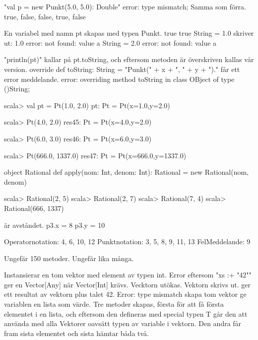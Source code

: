 "val p = new Punkt(5.0, 5.0): Double" error: type mismatch;
Samma som förra.
\Subtask 
true, false, false, true, false

\Task %
\Subtask 
En variabel med namn pt skapas med typen Punkt.
true
true
String = 1.0
skriver ut: 1.0
error: not found: value a
String = 2.0
error: not found: value a

\Task %
\Subtask 
"println(pt)" kallar på pt.toString, och eftersom metoden är överskriven kallas vår version.
\Subtask 
override def toString: String = "Punkt(" + x + ", " + y + ")."
\Subtask 
får ett error meddelande.
error: overriding method toString in class OBject of type ()String;

\Task %
\Subtask 
\begin{REPL}
scala> val pt = Pt(1.0, 2.0)
pt: Pt = Pt(x=1.0,y=2.0)

scala> Pt(4.0, 2.0)
res45: Pt = Pt(x=4.0,y=2.0)

scala> Pt(6.0, 3.0)
res46: Pt = Pt(x=6.0,y=3.0)

scala> Pt(666.0, 1337.0)
res47: Pt = Pt(x=666.0,y=1337.0)
\end{REPL}
\Subtask {}
\Subtask {}
\Subtask 
\begin{REPLnonum}
object Rational { 
def apply(nom: Int, denom: Int): Rational = new Rational(nom, denom)
}
\end{REPLnonum}
\Subtask 
\begin{REPL}
scala> Rational(2, 5)
scala> Rational(2, 7)
scala> Rational(7, 4)
scala> Rational(666, 1337)
\end{REPL}

\Task %
\Subtask {}

\Task %
 är avståndet.
\Subtask 
p3.x = 8
p3.y = 10

\Task %
\Subtask 
Operatornotation:	4, 6, 10, 12
Punktnotation:		3, 5, 8, 9, 11, 13
FelMeddelande:		9

\Task %
\Subtask  Ungefär 150 metoder.
\Subtask  Ungefär lika många.

\Task %
\Subtask 
Instansierar en tom vektor med element av typen int.
Error eftersom "xs :+ "42"" ger en Vector[Any] när Vector[Int] krävs.
Vecktorn utökas.
Vektorn skrivs ut.
ger ett resultat av vektorn plus talet 42.
Error: type mismatch
skapa tom vektor
ge variablen en lista som värde.
\Subtask 
Tre metoder skapas, första för att få första elementet i en lista, och eftersom den defineras med special typen T går den att använda med alla Vektorer oavsätt typen av variable i vektorn. Den andra får fram sista elementet och sista hämtar båda två.

